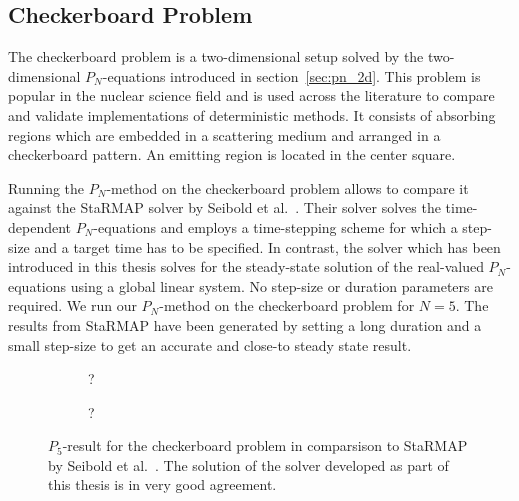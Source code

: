 \subsection{Checkerboard Problem}
\label{sec:pn_results_checkerboard}

The checkerboard problem is a two-dimensional setup solved by the two-dimensional $P_N$-equations introduced in section~\ref{sec:pn_2d}. This problem is popular in the nuclear science field and is used across the literature to compare and validate implementations of deterministic methods. It consists of absorbing regions which are embedded in a scattering medium and arranged in a checkerboard pattern. An emitting region is located in the center square.

Running the $P_N$-method on the checkerboard problem allows to compare it against the \textsf{StaRMAP} solver by Seibold et al.~\cite{Seibold14}. Their solver solves the time-dependent $P_N$-equations and employs a time-stepping scheme for which a step-size and a target time has to be specified. In contrast, the solver which has been introduced in this thesis solves for the steady-state solution of the real-valued $P_N$-equations using a global linear system. No step-size or duration parameters are required. We run our $P_N$-method on the checkerboard problem for $N=5$. The results from \textsf{StaRMAP} have been generated by setting a long duration and a small step-size to get an accurate and close-to steady state result.
\begin{figure}[h]
\centering
\begin{subfigure}{0.49\columnwidth}
\caption{?}
\end{subfigure}%
\hspace{0.01\columnwidth}
\begin{subfigure}{0.49\columnwidth}
\caption{?}
\end{subfigure}%
\caption{$P_5$-result for the checkerboard problem in comparsison to \textsf{StaRMAP} by Seibold et al.~\cite{Seibold14}. The solution of the solver developed as part of this thesis is in very good agreement.}
\label{fig:pn_results_checkerboard1}
\end{figure}


